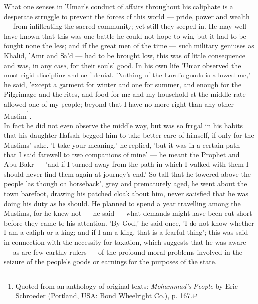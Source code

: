 \documentclass[11pt, b5paper, twoside]{book}
\begin{document}
What one senses in 'Umar's conduct of affairs throughout his caliphate is a desperate struggle to prevent the forces of this world --- pride, power and wealth --- from infiltrating the sacred community; yet still they seeped in. He may well have known that this was one battle he could not hope to win, but it had to be fought none the less; and if the great men of the time --- such military geniuses as Khalid, 'Amr and Sa'd --- had to be brought low, this was of little consequence and was, in any case, for their souls' good. In his own life 'Umar observed the most rigid discipline and self-denial. 'Nothing of the Lord's goods is allowed me,' he said, 'except a garment for winter and one for summer, and enough for the Pilgrimage and the rites, and food for me and my household at the middle rate allowed one of my people; beyond that I have no more right than any other Muslim\footnote{Quoted from an anthology of original texts: \emph{Mohammad's People} by Eric Schroeder (Portland, USA: Bond Wheelright Co.), p. 167.}. \\

In fact he did not even observe the middle way, but was so frugal in his habits that his daughter Hafsah begged him to take better care of himself, if only for the Muslims' sake. 'I take your meaning,' he replied, 'but it was in a certain path that I said farewell to two companions of mine' --- he meant the Prophet and Abu Bakr --- 'and if I turned away from the path in which I walked with them I should never find them again at journey's end.' So tall that he towered above the people 'as though on horseback', grey and prematurely aged, he went about the town barefoot, drawing his patched cloak about him, never satisfied that he was doing his duty as he should. He planned to spend a year travelling among the Muslims, for he knew not --- he said --- what demands might have been cut short before they came to his attention. 'By God,' he said once, 'I do not know whether I am a caliph or a king; and if I am a king, that is a fearful thing'; this was said in connection with the necessity for taxation, which suggests that he was aware --- as are few earthly rulers --- of the profound moral problems involved in the seizure of the people's goods or earnings for the purposes of the state. \\
\end{document}

